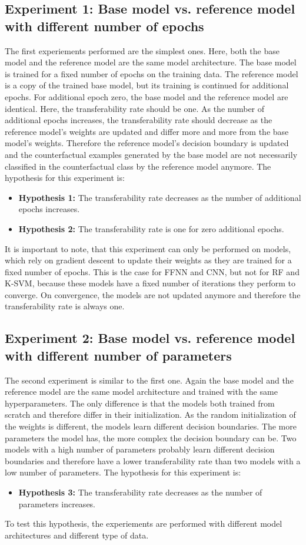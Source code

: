 \documentclass{article}
\begin{document}
\subsection{Experiment 1: Base model vs. reference model with different number of epochs}
The first experiements performed are the simplest ones. Here, both the base model and the reference model are the same model architecture. The base model is trained for a fixed number of epochs on the training data. The reference model is a copy of the trained base model, but its training is continued for additional epochs. For additional epoch zero, the base model and the reference model are identical. Here, the transferability rate should be one. As the number of additional epochs increases, the transferability rate should decrease as the reference model's weights are updated and differ more and more from the base model's weights. Therefore the reference model's decision boundary is updated and the counterfactual examples generated by the base model are not necessarily classified in the counterfactual class by the reference model anymore. 
The hypothesis for this experiment is:
\begin{itemize}
    \item \textbf{Hypothesis 1:} The transferability rate decreases as the number of additional epochs increases.
    \item \textbf{Hypothesis 2:} The transferability rate is one for zero additional epochs.
\end{itemize}
It is important to note, that this experiment can only be performed on models, which rely on gradient descent to update their weights as they are trained for a fixed number of epochs. This is the case for FFNN and CNN, but not for RF and K-SVM, because these models have a fixed number of iterations they perform to converge. On convergence, the models are not updated anymore and therefore the transferability rate is always one.

\subsection{Experiment 2: Base model vs. reference model with different number of parameters}
The second experiment is similar to the first one. Again the base model and the reference model are the same model architecture and trained with the same hyperparameters. The only difference is that the models both trained from scratch and therefore differ in their initialization. As the random initialization of the weights is different, the models learn different decision boundaries. The more parameters the model has, the more complex the decision boundary can be. Two models with a high number of parameters probably learn different decision boundaries and therefore have a lower transferability rate than two models with a low number of parameters. The hypothesis for this experiment is:
\begin{itemize}
    \item \textbf{Hypothesis 3:} The transferability rate decreases as the number of parameters increases.
\end{itemize}
To test this hypothesis, the experiements are performed with different model architectures and different type of data. 
\end{document}
